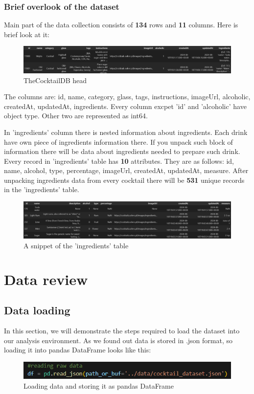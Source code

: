 \documentclass[a4paper]{article}
\begin{document}
\subsubsection{Brief overlook of the dataset}
Main part of the data collection consists of \textbf{134} rows and \textbf{11} columns. Here is brief look at it:

\begin{figure}[H]
    \centering
    \includegraphics[width=1\linewidth]{base_head.png}
    \caption{TheCocktailDB head}
    \label{fig:TheCocktailDB_head}
\end{figure}

The columns are: id, name, category, glass, tags, instructions, imageUrl, alcoholic, createdAt, updatedAt, ingredients. Every column excpet 'id' and 'alcoholic' have object type. Other two are represented as int64.

In 'ingredients' column there is nested information about ingredients. Each drink have own piece of ingredients information there. If you unpack such block of information there will be data about ingredients needed to prepare such drink. Every record in 'ingredients' table has \textbf{10} attributes. They are as follows: id, name, alcohol, type, percentage, imageUrl, createdAt, updatedAt, measure. After unpacking ingredients data from every cocktail there will be \textbf{531} unique records in the 'ingredients' table.

\begin{figure}[H]
    \centering
    \includegraphics[width=1\linewidth]{ingredients_head.png}
    \caption{A snippet of the 'ingredients' table}
    \label{fig:ingredients_head}
\end{figure}

\section{Data review}
\subsection{Data loading}
In this section, we will demonstrate the steps required to load the dataset into our analysis environment. As we found out data is stored in .json format, so loading it into pandas DataFrame looks like this:
\begin{figure}[H]
    \centering
    \includegraphics[width=1\linewidth]{loading.png}
    \caption{Loading data and storing it as pandas DataFrame}
    \label{fig:enter-label}
\end{figure}
\end{document}
